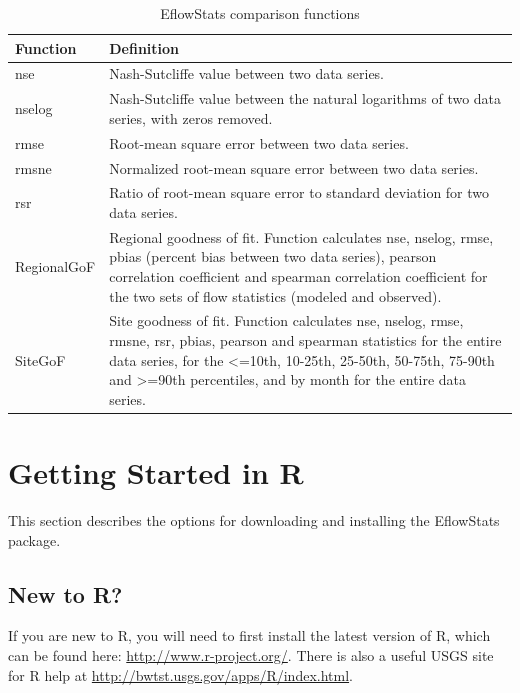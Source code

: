 \documentclass[a4paper,11pt]{article}\usepackage[]{graphicx}\usepackage[]{color}
\begin{document}
\begin{table}[ht]
  \centering
  \begin{threeparttable}[b]
  \caption{EflowStats comparison functions}
  \label{tab:compStats}
\begin{tabularx}{\textwidth}{|l|X|}
  \hline
\textbf{Function} & \textbf{Definition} \\ 
  \hline
  nse & Nash-Sutcliffe value between two data series. \\
  nselog & Nash-Sutcliffe value between the natural logarithms of two data series, with zeros removed. \\
  rmse & Root-mean square error between two data series. \\
  rmsne & Normalized root-mean square error between two data series. \\
  rsr & Ratio of root-mean square error to standard deviation for two data series. \\
  RegionalGoF & Regional goodness of fit. Function calculates nse, nselog, rmse, pbias (percent bias between two data series), pearson correlation coefficient and spearman correlation coefficient for the two sets of flow statistics (modeled and observed). \\
  SiteGoF & Site goodness of fit. Function calculates nse, nselog, rmse, rmsne, rsr, pbias, pearson and  spearman statistics for the entire data series, for the <=10th, 10-25th, 25-50th, 50-75th, 75-90th and >=90th percentiles, and by month for the entire data series. \\
   \hline
\end{tabularx}
\end{threeparttable}
\end{table}

\FloatBarrier
\clearpage

\section{Getting Started in R}
\label{sec:started}
This section describes the options for downloading and installing the EflowStats package.

\subsection{New to R?}
If you are new to R, you will need to first install the latest version of R, which can be found here: \url{http://www.r-project.org/}. There is also a useful USGS site for R help at \url{http://bwtst.usgs.gov/apps/R/index.html}.
\end{document}
